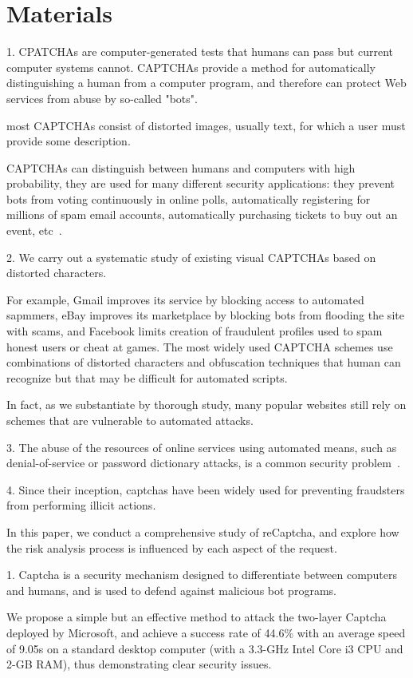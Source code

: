 \section{Materials}

1. CPATCHAs are computer-generated tests that humans can pass but current computer systems cannot. CAPTCHAs provide a method for automatically distinguishing a human from a computer program, and therefore can protect Web services from abuse by so-called "bots".

most CAPTCHAs consist of distorted images, usually text, for which a user must provide some description.

CAPTCHAs can distinguish between humans and computers with high probability, they are used for many different security applications: they prevent bots from voting continuously in online polls, automatically registering for millions of spam email accounts, automatically purchasing tickets to buy out an event, etc~\cite{Tam2008Breaking}.

2. We carry out a systematic study of existing visual CAPTCHAs based on distorted characters.

For example, Gmail improves its service by blocking access to automated sapmmers, eBay improves its marketplace by blocking bots from flooding the site with scams, and Facebook limits creation of fraudulent profiles used to spam honest users or cheat at games. The most widely used CAPTCHA schemes use combinations of distorted characters and obfuscation techniques that human can recognize but that may be difficult for automated scripts.

In fact, as we substantiate by thorough study, many popular websites still rely on schemes that are vulnerable to automated attacks.

3. The abuse of the resources of online services using automated means, such as denial-of-service or password dictionary attacks, is a common security problem~\cite{Mohamed2014A}.

4. Since their inception, captchas have been widely used for preventing fraudsters from performing illicit actions.

In this paper, we conduct a comprehensive study of reCaptcha, and explore how the risk analysis process is influenced by each aspect of the request.

1. Captcha is a security mechanism designed to differentiate between computers and humans, and is used to defend against malicious bot programs.

We propose a simple but an effective method to attack the two-layer Captcha deployed by Microsoft, and achieve a success rate of 44.6\% with an average speed of 9.05s on a standard desktop computer (with a 3.3-GHz Intel Core i3 CPU and 2-GB RAM), thus demonstrating clear security issues.

